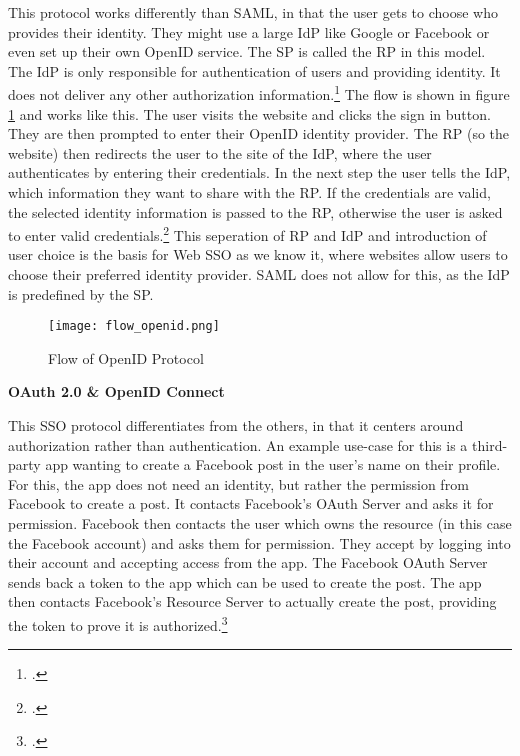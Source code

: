 This protocol works differently than \ac{SAML}, in that the user gets to choose who provides their identity.
They might use a large \ac{IdP} like Google or Facebook or even set up their own OpenID service.
The \ac{SP} is called the \ac{RP} in this model. The \ac{IdP} is only responsible for authentication of users
and providing identity. It does not deliver any other authorization information.\footcite[Cp.][p. 21]{Bazaz2016}
The flow is shown in figure \ref{fig:flow_openid} and works like this.
The user visits the website and clicks the sign in button. They are then prompted to enter their OpenID identity provider.
The \ac{RP} (so the website) then redirects the user to the site of the \ac{IdP}, where the user authenticates by
entering their credentials. In the next step the user tells the \ac{IdP}, which information they want to share with
the \ac{RP}. If the credentials are valid, the selected identity information is passed to the \ac{RP}, otherwise
the user is asked to enter valid credentials.\footcite[Cp.][p. 21]{Bazaz2016}
This seperation of \ac{RP} and \ac{IdP} and introduction of user choice is the basis for Web \ac{SSO} as we know it,
where websites allow users to choose their preferred identity provider.
\ac{SAML} does not allow for this, as the \ac{IdP} is predefined by the \ac{SP}.

\begin{figure}[H]
    \centering
    \caption{Flow of OpenID Protocol}
	\label{fig:flow_openid}
    \texttt{[image: flow\_openid.png]}
    \\
    \cite[Source:][p. 22]{Bazaz2016}
\end{figure}

\textbf{OAuth 2.0 \& OpenID Connect}

This \ac{SSO} protocol differentiates from the others, in that it centers around authorization rather than authentication.
An example use-case for this is a third-party app wanting to create a Facebook post in the user's name on their profile.
For this, the app does not need an identity, but rather the permission from Facebook to create a post.
It contacts Facebook's OAuth Server and asks it for permission. Facebook then contacts the user which owns the resource
(in this case the Facebook account) and asks them for permission. They accept by logging into their account and accepting
access from the app. The Facebook OAuth Server sends back a token to the app which can be used to create the post.
The app then contacts Facebook's Resource Server to actually create the post, providing the token to prove it is authorized.\footcite[Cp.][]{Wesener2021}

